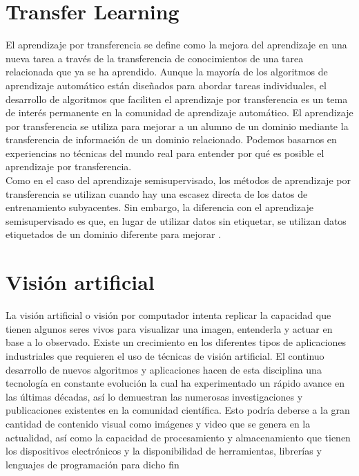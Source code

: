 \section{Transfer Learning}
El aprendizaje por transferencia se define como la mejora del aprendizaje en una nueva tarea a través de la transferencia de conocimientos de una tarea relacionada que ya se ha aprendido. Aunque la mayoría de los algoritmos de aprendizaje automático están diseñados para abordar tareas individuales, el desarrollo de algoritmos que faciliten el aprendizaje por transferencia es un tema de interés permanente en la comunidad de aprendizaje automático. El aprendizaje por transferencia se utiliza para mejorar a un alumno de un dominio mediante la transferencia de información de un dominio relacionado. Podemos basarnos en experiencias no técnicas del mundo real para entender por qué es posible el aprendizaje por transferencia.\\

Como en el caso del aprendizaje semisupervisado, los métodos de aprendizaje por transferencia se utilizan cuando hay una escasez directa de los datos de entrenamiento subyacentes. Sin embargo, la diferencia con el aprendizaje semisupervisado es que, en lugar de utilizar datos sin etiquetar, se utilizan datos etiquetados de un dominio diferente para mejorar \cite{ref_14}.



\section{Visión artificial} La visión artificial o visión por computador intenta replicar la capacidad que tienen algunos seres vivos para visualizar una imagen, entenderla y actuar en base a lo observado. Existe un crecimiento en los diferentes tipos de aplicaciones industriales que requieren el uso de técnicas de visión artificial. El  continuo  desarrollo  de  nuevos  algoritmos  y  aplicaciones  hacen  de  esta  disciplina  una tecnología en constante evolución la cual ha experimentado un rápido avance en las últimas décadas, así lo demuestran las numerosas investigaciones y publicaciones existentes en la comunidad científica.  Esto podría deberse a la gran cantidad de contenido visual como imágenes y video que se genera en  la  actualidad,  así  como  la  capacidad  de  procesamiento  y  almacenamiento  que  tienen  los dispositivos electrónicos y la disponibilidad de herramientas, librerías y lenguajes de programación para dicho fin \cite{ref_15}

